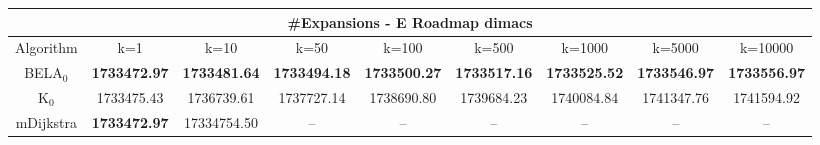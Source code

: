 \begin{tabular}{c|cccccccc}\toprule
\multicolumn{9}{c}{#Expansions - E Roadmap dimacs}\\ \midrule
Algorithm & k=1 & k=10 & k=50 & k=100 & k=500 & k=1000 & k=5000 & k=10000 \\ \midrule
BELA$_0$ & \textbf{1733472.97} & \textbf{1733481.64} & \textbf{1733494.18} & \textbf{1733500.27} & \textbf{1733517.16} & \textbf{1733525.52} & \textbf{1733546.97} & \textbf{1733556.97} \\
K$_0$ & 1733475.43 & 1736739.61 & 1737727.14 & 1738690.80 & 1739684.23 & 1740084.84 & 1741347.76 & 1741594.92 \\
mDijkstra & \textbf{1733472.97} & 17334754.50 & -- & -- & -- & -- & -- & -- \\ \bottomrule 
\end{tabular}
